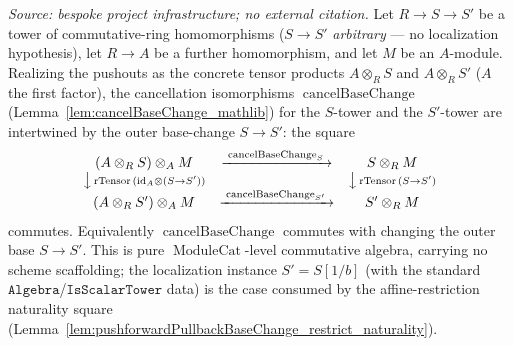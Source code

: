\begin{lemma}
  \label{lem:cancelBaseChange_localization_compat}
  \textit{Source: bespoke project infrastructure; no external citation.}
  Let \(R \to S \to S'\) be a tower of commutative-ring homomorphisms (\(S \to S'\)
  \emph{arbitrary} --- no localization hypothesis), let \(R \to A\) be a further homomorphism, and
  let \(M\) be an \(A\)-module. Realizing the pushouts as the concrete tensor products
  \(A \otimes_R S\) and \(A \otimes_R S'\) (\(A\) the first factor), the cancellation
  isomorphisms \(\operatorname{cancelBaseChange}\) (Lemma~\ref{lem:cancelBaseChange_mathlib}) for the
  \(S\)-tower and the \(S'\)-tower are intertwined by the outer base-change \(S \to S'\): the square
  \[
    \begin{array}{ccc}
      (A \otimes_R S) \otimes_A M & \xrightarrow{\;\operatorname{cancelBaseChange}_S\;} & S \otimes_R M\\
      \big\downarrow{\scriptstyle\,\mathrm{rTensor}\,(\mathrm{id}_A \otimes (S\to S'))} & & \big\downarrow{\scriptstyle\,\mathrm{rTensor}\,(S \to S')}\\
      (A \otimes_R S') \otimes_A M & \xrightarrow{\;\operatorname{cancelBaseChange}_{S'}\;} & S' \otimes_R M
    \end{array}
  \]
  commutes. Equivalently \(\operatorname{cancelBaseChange}\) commutes with changing the outer base
  \(S \to S'\). This is pure \(\operatorname{ModuleCat}\)-level commutative algebra, carrying no
  scheme scaffolding; the localization instance \(S' = S[1/b]\) (with the standard
  \(\mathtt{Algebra}\)/\(\mathtt{IsScalarTower}\) data) is the case consumed by the
  affine-restriction naturality square
  (Lemma~\ref{lem:pushforwardPullbackBaseChange_restrict_naturality}).
\end{lemma}

